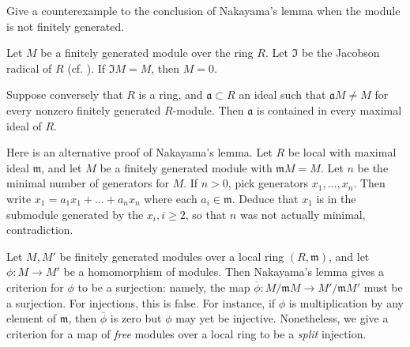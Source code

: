 \begin{exercise}
Give a counterexample to the conclusion of Nakayama's lemma when the module is
not finitely generated.
\end{exercise}
\begin{exercise}
Let $M$ be a finitely generated module over the ring $R$. Let $\mathfrak{I}$
be the Jacobson
radical of $R$ (cf. ). If $\mathfrak{I} M = M$,
then $M =
0$.
\end{exercise}

\begin{exercise}
Suppose conversely that $R$ is a ring, and $\mathfrak{a} \subset R$ an ideal
such that $\mathfrak{a} M \neq M$ for every nonzero finitely generated
$R$-module. Then $\mathfrak{a}$ is contained in every maximal ideal of $R$.
\end{exercise}


\begin{exercise}
Here is an alternative proof of Nakayama's lemma. Let $R$ be local with
maximal ideal $\mathfrak{m}$, and let $M$ be a finitely generated module with
$\mathfrak{m}M = M$. Let $n$ be the minimal number of generators for $M$. If
$n>0$, pick generators $x_1, \dots, x_n$. Then write $x_1 = a_1 x_1 + \dots +
a_n x_n$ where each $a_i \in \mathfrak{m}$. Deduce that $x_1$ is in the
submodule generated by the $x_i, i \geq 2$, so that $n$ was not actually
minimal, contradiction.
\end{exercise}

Let $M, M'$ be finitely generated modules over a local ring $(R,
\mathfrak{m})$, and let $\phi: M \to M'$ be a homomorphism of modules. Then
Nakayama's lemma gives a criterion for $\phi$ to be a surjection: namely, the
map $\overline{\phi}: M/\mathfrak{m}M \to M'/\mathfrak{m}M'$ must be a surjection.
For injections, this is false. For instance, if $\phi$ is  multiplication by any element of
$\mathfrak{m}$, then $\overline{\phi}$ is zero but $\phi$ may yet be injective.
Nonetheless, we give a criterion for a map of \emph{free} modules over a local ring to
be a \emph{split}  injection.

